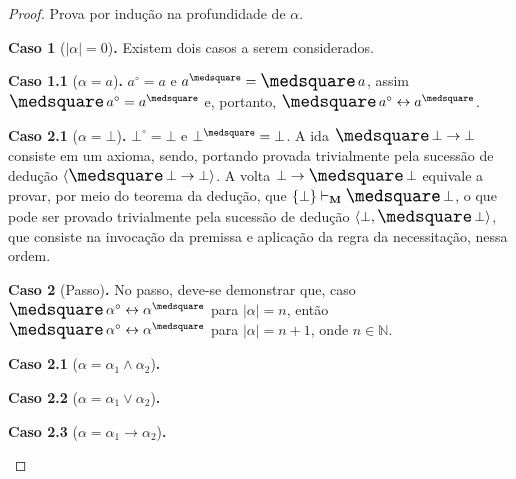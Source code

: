 \documentclass{report}
\begin{document}
    \begin{proof}
        Prova por indução na profundidade de $\alpha$.

        \begin{case}
            \textbf{Caso 1} ($|\alpha| = 0$)\textbf{.}
                Existem dois casos a serem considerados.

                \begin{case}
                \textbf{Caso 1.1} ($\alpha = a$)\textbf{.}
                    $a^\circ = a$ e $a^\medsquare = \nec a$, assim $\nec a^\circ = a^\medsquare$ e, portanto, $\nec a^\circ \leftrightarrow a^\medsquare$.
                \end{case}
                \begin{case}
                \textbf{Caso 2.1} ($\alpha = \bot$)\textbf{.}
                    $\bot^\circ = \bot$ e $\bot^\medsquare = \bot$. A ida $\nec\bot\to\bot$ consiste em um axioma, sendo, portando provada trivialmente pela sucessão de dedução $\sequence{\nec\bot\to\bot}$.
                    A volta $\bot\to\nec\bot$ equivale a provar, por meio do teorema da dedução, que $\set{\bot}\vdash_\mathbf{M}\nec\bot$, o que pode ser provado trivialmente pela sucessão de dedução $\sequence{\bot, \nec\bot}$, que consiste na invocação da premissa e aplicação da regra da necessitação, nessa ordem.
                \end{case}
        \end{case}

        \begin{case}
            \textbf{Caso 2} (Passo)\textbf{.} No passo, deve-se demonstrar que, caso $\nec\alpha^\circ\leftrightarrow\alpha^\medsquare$ para $|\alpha| = n$, 
            então $\nec\alpha^\circ\leftrightarrow\alpha^\medsquare$ para $|\alpha|= n + 1$, onde $n \in \mathbb{N}$.

            \begin{case}
                \textbf{Caso 2.1} ($\alpha = \alpha_1\wedge\alpha_2$)\textbf{.}
            \end{case}

            \begin{case}
                \textbf{Caso 2.2} ($\alpha = \alpha_1\vee\alpha_2$)\textbf{.}
            \end{case}

            \begin{case}
                \textbf{Caso 2.3} ($\alpha = \alpha_1\to\alpha_2$)\textbf{.}
            \end{case}
        \end{case}
    \end{proof}
\end{document}
